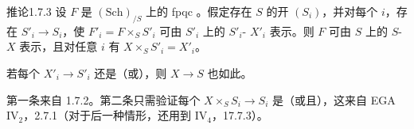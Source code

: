 \begin{SGAresult}{推论}{1.7.3}
设 $F$ 是 $(\mathrm{Sch})_{/S}$ 上的 fpqc 。假定存在 $S$ 的开 $(S_i)$，并对每个 $i$，存在 $S'_i\to S_i$，使 $F'_i=F\times_SS'_i$ 可由 $S'_i$ 上的 $S'_i$- $X'_i$ 表示。则 $F$ 可由 $S$ 上的 $S$- $X$ 表示，且对任意 $i$ 有 $X\times_SS'_i=X'_i$。

若每个 $X'_i\to S'_i$ 还是（或），则 $X\to S$ 也如此。
\end{SGAresult}
第一条来自 1.7.2。第二条只需验证每个 $X\times_SS_i\to S_i$ 是（或且），这来自 EGA IV$_2$，2.7.1（对于后一种情形，还用到 IV$_4$，17.7.3）。

